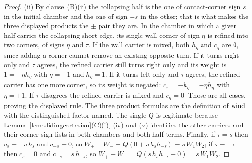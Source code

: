 \begin{proof}
(ii) By clause~(B)(ii) the collapsing half is the one of
contact-corner sign $s$ in the initial chamber and the one of sign $-s$ in the
other; that is what makes the three displayed products the $\pm$ pair they are.
In the chamber in which a given half carries the collapsing short edge, its
single wall corner of sign $\eta$ is refined into two corners, of signs $\eta$
and $\tau$. If the wall carrier is mixed, both $h_\eta$ and $c_\eta$ are $0$,
since adding a corner cannot remove an existing opposite turn. If it turns
right only and $\tau$ agrees, the refined carrier still turns right only and
its weight is $1=-\eta h_\eta$ with $\eta=-1$ and $h_\eta=1$. If it turns left
only and $\tau$ agrees, the refined carrier has one more corner, so its weight
is negated: $c_\eta=-h_\eta=-\eta h_\eta$ with $\eta=+1$. If $\tau$ disagrees
the refined carrier is mixed and $c_\eta=0$. Those are all cases, proving the
displayed rule. The three product formulas are the definition of $\operatorname{wind}$ with
the distinguished factor named. The single $Q$ is legitimate because
Lemma~\ref{lem:slidingcartesian}(C)(i), (iv) and (v) identifies the other carriers and
their corner-sign lists in both chambers and both half terms. Finally, if
$\tau=s$ then $c_s=-s\,h_s$ and $c_{-s}=0$, so
$W_+-W_-=Q(0+s\,h_sh_{-s})=s\,W_1W_2$; if $\tau=-s$ then $c_s=0$ and
$c_{-s}=s\,h_{-s}$, so $W_+-W_-=Q(s\,h_sh_{-s}-0)=s\,W_1W_2$.


\end{proof}
